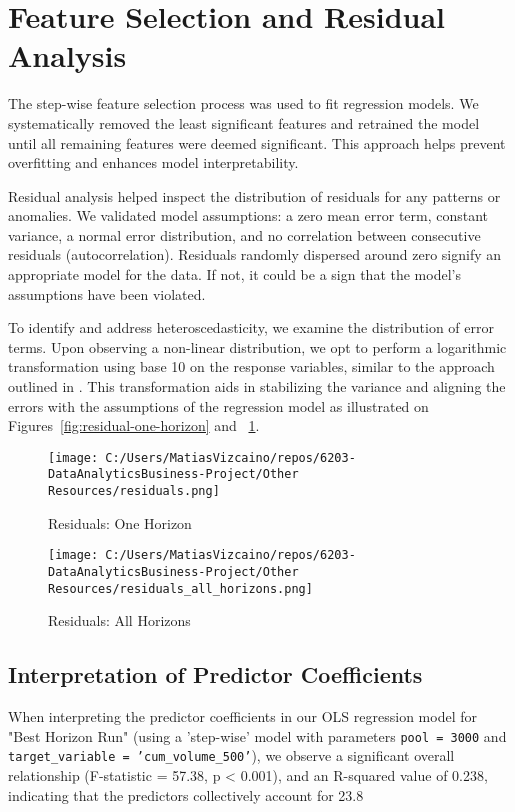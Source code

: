 \documentclass{article}
\begin{document}
\section{\textbf{Feature Selection and Residual Analysis}}

The step-wise feature selection process was used to fit regression models. We systematically removed the least significant features and retrained the model until all remaining features were deemed significant. This approach helps prevent overfitting and enhances model interpretability.


Residual analysis helped inspect the distribution of residuals for any patterns or anomalies. We validated model assumptions: a zero mean error term, constant variance, a normal error distribution, and no correlation between consecutive residuals (autocorrelation). Residuals randomly dispersed around zero signify an appropriate model for the data. If not, it could be a sign that the model's assumptions have been violated.

To identify and address heteroscedasticity, we examine the distribution of error terms. Upon observing a non-linear distribution, we opt to perform a logarithmic transformation using base 10 on the response variables, similar to the approach outlined in \cite{Miori2023}. This transformation aids in stabilizing the variance and aligning the errors with the assumptions of the regression model as illustrated on Figures~\ref{fig:residual-one-horizon} and ~\ref{fig:residual-all-horizons}.

\begin{figure}[htbp]
  \begin{minipage}{0.5\textwidth}
  \centering
  \texttt{[image: C:/Users/MatiasVizcaino/repos/6203-DataAnalyticsBusiness-Project/Other Resources/residuals.png]}
  \caption{Residuals: One Horizon}
  \label{fig:residual-one-horizon}
  \end{minipage}
  \begin{minipage}{0.45\textwidth}
  \centering
  \texttt{[image: C:/Users/MatiasVizcaino/repos/6203-DataAnalyticsBusiness-Project/Other Resources/residuals\_all\_horizons.png]}
  \caption{Residuals: All Horizons}
  \label{fig:residual-all-horizons}
  \end{minipage}
  \end{figure}

\subsection{Interpretation of Predictor Coefficients}
When interpreting the predictor coefficients in our OLS regression model for "Best Horizon Run" (using a 'step-wise' model with parameters \texttt{pool = 3000} and \texttt{target\_variable = 'cum\_volume\_500'}), we observe a significant overall relationship (F-statistic = 57.38, p \textless{} 0.001), and an R-squared value of 0.238, indicating that the predictors collectively account for 23.8%
\end{document}
